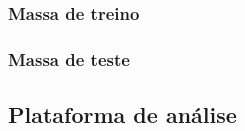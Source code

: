 \subsubsection{Massa de treino}


\subsubsection{Massa de teste}


\subsection{Plataforma de análise}
